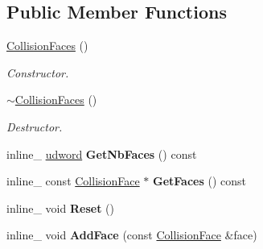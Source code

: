 \subsection*{Public Member Functions}
\begin{DoxyCompactItemize}
\item 
\hyperlink{classCollisionFaces_a0761a58635aec8c24492a4b9497e68a6}{Collision\+Faces} ()\hypertarget{classCollisionFaces_a0761a58635aec8c24492a4b9497e68a6}{}\label{classCollisionFaces_a0761a58635aec8c24492a4b9497e68a6}

\begin{DoxyCompactList}\small\item\em Constructor. \end{DoxyCompactList}\item 
\hyperlink{classCollisionFaces_a9b2944dc74e3315a4c9355fdedeeb556}{$\sim$\+Collision\+Faces} ()\hypertarget{classCollisionFaces_a9b2944dc74e3315a4c9355fdedeeb556}{}\label{classCollisionFaces_a9b2944dc74e3315a4c9355fdedeeb556}

\begin{DoxyCompactList}\small\item\em Destructor. \end{DoxyCompactList}\item 
inline\+\_\+ \hyperlink{IceTypes_8h_a44c6f1920ba5551225fb534f9d1a1733}{udword} {\bfseries Get\+Nb\+Faces} () const \hypertarget{classCollisionFaces_acdac7dbcfc09a49b05fc7b12363d69f6}{}\label{classCollisionFaces_acdac7dbcfc09a49b05fc7b12363d69f6}

\item 
inline\+\_\+ const \hyperlink{classCollisionFace}{Collision\+Face} $\ast$ {\bfseries Get\+Faces} () const \hypertarget{classCollisionFaces_a1114d6ce1b79b39209d33db54152386f}{}\label{classCollisionFaces_a1114d6ce1b79b39209d33db54152386f}

\item 
inline\+\_\+ void {\bfseries Reset} ()\hypertarget{classCollisionFaces_a14f7778792996117d2754eced0e22aaa}{}\label{classCollisionFaces_a14f7778792996117d2754eced0e22aaa}

\item 
inline\+\_\+ void {\bfseries Add\+Face} (const \hyperlink{classCollisionFace}{Collision\+Face} \&face)\hypertarget{classCollisionFaces_a4e391dcd12f0930e630420d639687742}{}\label{classCollisionFaces_a4e391dcd12f0930e630420d639687742}

\end{DoxyCompactItemize}


